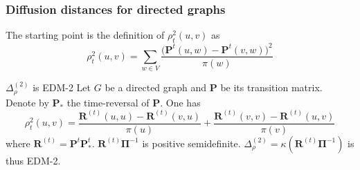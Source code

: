 \documentclass[professionalfonts, hyperref={pdfpagelabels=false,
  colorlinks=true, linkcolor=purple}]{beamer}
\begin{document}
\begin{frame}[label=directed_diffusion_distances]
  \frametitle{Diffusion distances for directed graphs}
    The starting point is the definition of
    $\rho_{t}^{2}(u,v)$ as
    \begin{equation}
      \label{eq:23}
      \rho_{t}^{2}(u,v) = \sum_{w \in V}{
        \frac{\bigl(\bm{P}^{t}(u,w) -
          \bm{P}^{t}(v,w)\bigr)^2}{\pi(w)}}     
    \end{equation}
    \begin{exampleblock}{$\Delta_{\rho}^{(2)}$ is EDM-2}
      Let $G$ be a directed graph and $\bm{P}$ be its transition
      matrix. Denote by $\bm{P}_{*}$ the time-reversal of $\bm{P}$. One has
      \begin{equation}
        \label{eq:24}
        \rho_{t}^{2}(u,v) = \frac{\bm{R}^{(t)}(u,u) - \bm{R}^{(t)}(v,u)}{\pi(u)} +
        \frac{\bm{R}^{(t)}(v,v) - \bm{R}^{(t)}(u,v)}{\pi(v)}
      \end{equation}
      where $\bm{R}^{(t)} = \bm{P}^{t} \bm{P}_{*}^{t}$. $\bm{R}^{(t)}
      \bm{\Pi}^{-1}$ is \alert{positive
        semidefinite}. $\Delta_{\rho}^{(2)} = \kappa(\bm{R}^{(t)}
      \bm{\Pi}^{-1})$ is thus EDM-2. 
    \end{exampleblock}
\end{frame}
\end{document}
